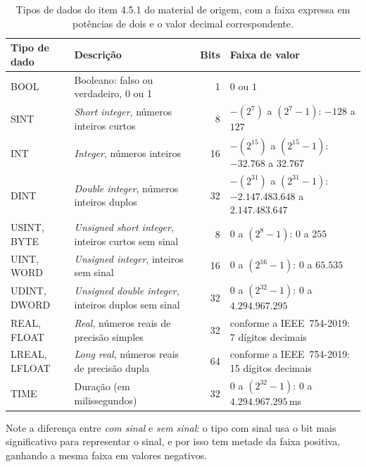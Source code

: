 \begin{table}[H]
  \centering
  \caption{Tipos de dados do item 4.5.1 do material de origem, com a faixa expressa em potências de
dois e o valor decimal correspondente.}
  \label{tab:tipos-dados}
  \begin{tabular}{p{2.5cm} p{4.7cm} r p{3.9cm}}
    \toprule
    Tipo de dado & Descrição & Bits & Faixa de valor \\
    \midrule
    BOOL
      & Booleano: falso ou verdadeiro, 0 ou 1 & 1 & $0$ ou $1$ \\
    SINT
      & \emph{Short integer}, números inteiros curtos & 8
      & $-(2^{7})$ a $(2^{7}-1)$: $-128$ a $127$ \\
    INT
      & \emph{Integer}, números inteiros & 16
      & $-(2^{15})$ a $(2^{15}-1)$: $-32.768$ a $32.767$ \\
    DINT
      & \emph{Double integer}, números inteiros duplos & 32
      & $-(2^{31})$ a $(2^{31}-1)$: $-2.147.483.648$ a $2.147.483.647$ \\
    USINT, BYTE
      & \emph{Unsigned short integer}, inteiros curtos sem sinal & 8
      & $0$ a $(2^{8}-1)$: $0$ a $255$ \\
    UINT, WORD
      & \emph{Unsigned integer}, inteiros sem sinal & 16
      & $0$ a $(2^{16}-1)$: $0$ a $65.535$ \\
    UDINT, DWORD
      & \emph{Unsigned double integer}, inteiros duplos sem sinal & 32
      & $0$ a $(2^{32}-1)$: $0$ a $4.294.967.295$ \\
    REAL, FLOAT
      & \emph{Real}, números reais de precisão simples & 32
      & conforme a IEEE~754-2019: 7 dígitos decimais \\
    LREAL, LFLOAT
      & \emph{Long real}, números reais de precisão dupla & 64
      & conforme a IEEE~754-2019: 15 dígitos decimais \\
    TIME
      & Duração (em milissegundos) & 32
      & $0$ a $(2^{32}-1)$: $0$ a $4.294.967.295$\,ms \\
    \bottomrule
  \end{tabular}
\end{table}

Note a diferença entre \emph{com sinal} e \emph{sem sinal}: o tipo com sinal usa o bit mais
significativo para representar o sinal, e por isso tem metade da faixa positiva, ganhando a mesma
faixa em valores negativos.

